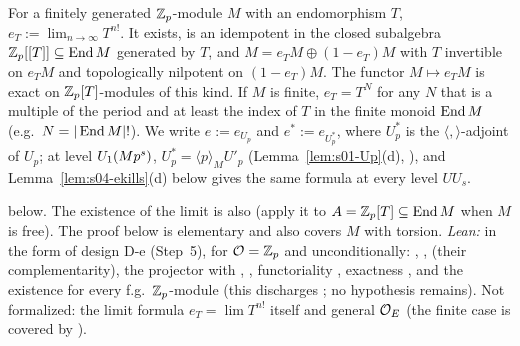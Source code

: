 \begin{definition}\label{def:s04-e}
For a finitely generated $\mathbb{Z}_p$-module $M$ with an endomorphism $T$, $e_T:=\lim_{n\to\infty}T^{n!}$. It exists, is an idempotent
in the closed subalgebra $\mathbb{Z}_p[[T]]\subseteq\operatorname{End} M$ generated by $T$, and $M=e_TM\oplus(1-e_T)M$ with $T$ invertible on $e_TM$ and
topologically nilpotent on $(1-e_T)M$. The functor $M\mapsto e_TM$ is exact on $\mathbb{Z}_p[T]$-modules of this kind. If $M$ is finite,
$e_T=T^{N}$ for any $N$ that is a multiple of the period and at least the index of $T$ in the finite monoid $\operatorname{End} M$
(e.g.\ $N=|\operatorname{End} M|!$). We write $e:=e_{U_p}$ and $e^*:=e_{U_p^*}$, where $U_p^*$ is the $\langle,\rangle$-adjoint of $U_p$; at level
$U_1(Mp^s)$, $U_p^*=\langle p\rangle_MU'_p$ (Lemma~\ref{lem:s01-Up}(d), ), and Lemma~\ref{lem:s04-ekills}(d)
below gives the same formula at every level $UU_s$.
\end{definition}
\noindent\stproved{} below. The existence of the limit is also \stknown{}
 (apply it to $A=\mathbb{Z}_p[T]\subseteq\operatorname{End} M$ when $M$ is free).
The proof below is elementary and also covers $M$ with torsion. \emph{Lean:} \stformal{} in the form of design D-e (Step~5), for $\mathcal{O}=\mathbb{Z}_p$ and unconditionally: ,
,  (their complementarity), the projector
 with , , functoriality
, exactness , and the existence for every f.g.\ $\mathbb{Z}_p$-module
 (this discharges ; no hypothesis remains). Not formalized: the
limit formula $e_T=\lim T^{n!}$ itself and general $\mathcal{O}_E$ (the finite case is covered by ).

